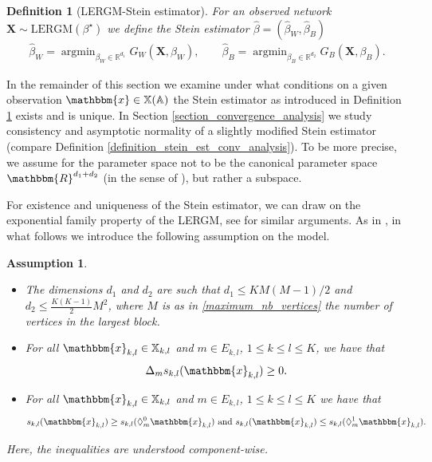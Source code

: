 \documentclass{article}
\newtheorem{Definition}[Theorem]{Definition}
\newtheorem{Assumption}[Theorem]{Assumption}
\DeclareMathOperator*{\argmin}{argmin}
\begin{document}
\begin{Definition}[LERGM-Stein estimator]\label{stein_estimator_def_noncompact}
    For an observed network $\mathbf{X} \sim \mathrm{LERGM}(\beta^\star)$ we define the Stein estimator $\hat{\beta}= (\hat{\beta}_W, {\hat{\beta}}_B)$ 
    \begin{align*}
        \hat{\beta}_W = \argmin_{\beta_W \in \mathbb{R}^{d_1}} G_W(\mathbf{X},\beta_W), \qquad \hat{\beta}_B = \argmin_{\beta_B \in \mathbb{R}^{d_2}} G_B(\mathbf{X},\beta_B).
    \end{align*}
\end{Definition}
In the remainder of this section we examine under what conditions on a given observation $\mathbbm{x} \in \mathbb{X}(\mathbb{A})$ the Stein estimator as introduced in Definition \ref{stein_estimator_def_noncompact} exists and is unique. In Section \ref{section_convergence_analysis} we study consistency and asymptotic normality of a slightly modified Stein estimator (compare Definition \ref{definition_stein_est_conv_analysis}). To be more precise, we assume for the parameter space not to be the canonical parameter space $\mathbbm{R}^{d_1+ d_2}$ (in the sense of \cite{sundberg2019statistical}), but rather a subspace. 

For existence and uniqueness of the Stein estimator, we can draw on the exponential family property of the LERGM, see \cite{stewart2026rates} for similar arguments. As in \cite{stewart2026rates}, in what follows we introduce the following assumption on the model. 
\begin{Assumption} \label{assumption_model}
   \begin{itemize} 
        \item[(i)] The dimensions $d_1$ and $d_2$ are such that $d_1 \leq K M(M-1)/{2}$ and $d_2 \leq \frac{K(K-1)}{2} M^2$,  where $M$ is as in \eqref{maximum_nb_vertices} the number of vertices in the largest block.  
        \item[(ii)]  For all $\mathbbm{x}_{k,l} \in \mathbb{X}_{k,l}$ and $m \in E_{k,l}$, $1 \leq k \leq l\leq K$, we have that 
        \begin{align*}
            \Delta_m s_{k,l}(\mathbbm{x}_{k,l}) \geq 0 .   
        \end{align*}
        \item[(iii)]  For all $\mathbbm{x}_{k,l} \in \mathbb{X}_{k,l}$ and $m \in E_{k,l}$, $1 \leq k \leq l\leq K$ we have that 
        \begin{align*}  
            s_{k,l}(\mathbbm{x}_{k,l}) \geq s_{k,l}(\Diamond_{m}^{0}\mathbbm{x}_{k,l})  \text{ and  } s_{k,l}(\mathbbm{x}_{k,l}) \leq s_{k,l}(\Diamond_{m}^{1}\mathbbm{x}_{k,l}).
        \end{align*}
    \end{itemize}
    Here, the inequalities are understood  component-wise.
\end{Assumption}
\end{document}
